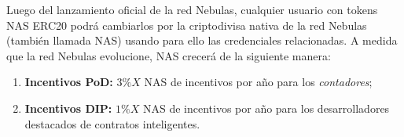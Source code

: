 Luego del lanzamiento oficial de la red Nebulas, cualquier usuario con tokens NAS ERC20 podrá cambiarlos por la criptodivisa nativa de la red Nebulas (también llamada NAS) usando para ello las credenciales relacionadas. A medida que la red Nebulas evolucione, NAS crecerá de la siguiente manera:

\begin{enumerate}
	\item \textbf{Incentivos PoD:} $3\%X$ NAS de incentivos por año para los \textit{contadores};

	\item \textbf{Incentivos DIP:} $1\%X$ NAS de incentivos por año para los desarrolladores destacados de contratos inteligentes.

\end{enumerate}